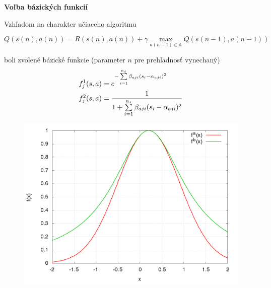 \documentclass[xcolor=dvipsnames]{beamer}
\begin{document}
\begin{frame}{\bf Voľba bázických funkcií}

Vzhľadom na charakter učiaceho algoritmu

\begin{equation} \label{eu_eqn}
Q(s(n),a(n)) = R(s(n),a(n)) + \gamma \max_{a(n-1) \in \mathbb{A}} Q(s(n-1), a(n-1)) \nonumber
\end{equation}



\begin{minipage}{.5\textwidth}
  boli zvolené bázické funkcie (parameter $n$ pre prehľadnosť vynechaný)
  \begin{align*}
  f_j^1(\boldmath{s, a}) &= e^{ -\sum\limits_{i=1}^{n_s}{\beta_{aji}(s_i - \alpha_{aji})^2} } \\
  f_j^2(\boldmath{s, a}) &= \frac{1}{1 + \sum\limits_{i=1}^{n_s}{\beta_{aji}(s_i - \alpha_{aji})^2}} \\
  \end{align*}


\end{minipage}%
\begin{minipage}{.5\textwidth}

  \begin{figure}[!htb]
  \centering
  \includegraphics[scale=.2]{../pictures/gaussian_1D.png}
  \end{figure}

\end{minipage}





\end{frame}
\end{document}
